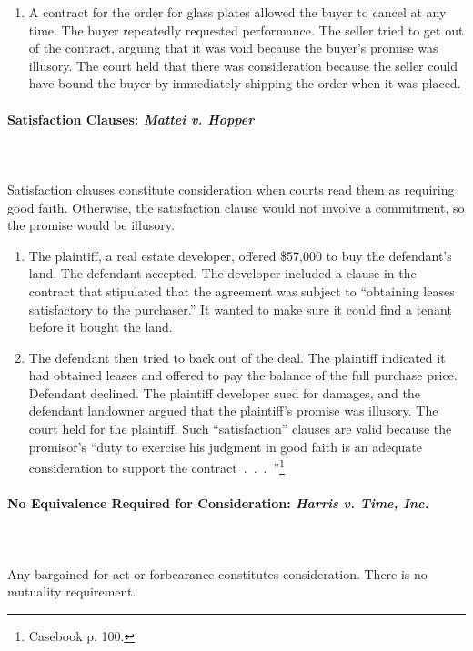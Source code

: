 \begin{enumerate}
    \item A contract for the order for glass plates allowed the buyer to 
    cancel at any time. The buyer repeatedly requested performance. The seller 
    tried to get out of the contract, arguing that it was void because the 
    buyer's promise was illusory. The court held that there was consideration 
    because the seller could have bound the buyer by immediately shipping the 
    order when it was placed.
\end{enumerate}

\paragraph{Satisfaction Clauses: \emph{Mattei v. Hopper}}
~\\\\
Satisfaction clauses constitute consideration when courts read them as 
requiring good faith. Otherwise, the satisfaction clause would not involve a 
commitment, so the promise would be illusory.

\begin{enumerate}
    \item The plaintiff, a real estate developer, offered \$57,000 to buy the 
    defendant's land. The defendant accepted. The developer included a clause 
    in the contract that stipulated that the agreement was subject to 
    ``obtaining leases satisfactory to the purchaser.'' It wanted to make sure 
    it could find a tenant before it bought the land.
    \item The defendant then tried to back out of the deal. The plaintiff 
    indicated it had obtained leases and offered to pay the balance of the 
    full purchase price. Defendant declined. The plaintiff developer sued for 
    damages, and the defendant landowner argued that the plaintiff's promise 
    was illusory. The court held for the plaintiff. Such ``satisfaction'' 
    clauses are valid because the promisor's ``duty to exercise his judgment 
    in good faith is an adequate consideration to support the 
    contract~.~.~.~''\footnote{Casebook p. 100.}
\end{enumerate}

\paragraph{No Equivalence Required for Consideration: \emph{Harris v. Time, 
Inc.}}
~\\\\
Any bargained-for act or forbearance constitutes consideration. There is no 
mutuality requirement.

